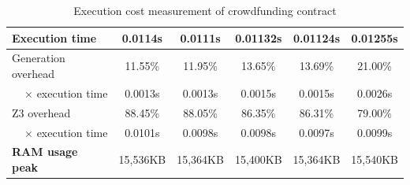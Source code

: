 \documentclass[english,runningheads]{llncs}
\begin{document}
\begin{table}[]
{\begin{tabular}{l||lllll}
\textbf{Execution time}                & \multicolumn{1}{c|}{0.0114s}  & \multicolumn{1}{c|}{0.0111s}  & \multicolumn{1}{c|}{0.01132s} & \multicolumn{1}{c|}{0.01124s} & \multicolumn{1}{c}{0.01255s} \\ \hline
Generation overhead                    & \multicolumn{1}{c|}{11.55\%}  & \multicolumn{1}{c|}{11.95\%}  & \multicolumn{1}{c|}{13.65\%}  & \multicolumn{1}{c|}{13.69\%}  & \multicolumn{1}{c}{21.00\%} \\ \hline
\multicolumn{1}{r||}{× execution time} & \multicolumn{1}{c|}{0.0013s}  & \multicolumn{1}{c|}{0.0013s}  & \multicolumn{1}{c|}{0.0015s}  & \multicolumn{1}{c|}{0.0015s}  & \multicolumn{1}{c}{0.0026s} \\ \hline
Z3 overhead                            & \multicolumn{1}{c|}{88.45\%}  & \multicolumn{1}{c|}{88.05\%}  & \multicolumn{1}{c|}{86.35\%}  & \multicolumn{1}{c|}{86.31\%}  & \multicolumn{1}{c}{79.00\%} \\ \hline
\multicolumn{1}{r||}{× execution time} & \multicolumn{1}{c|}{0.0101s}  & \multicolumn{1}{c|}{0.0098s}  & \multicolumn{1}{c|}{0.0098s}  & \multicolumn{1}{c|}{0.0097s}  & \multicolumn{1}{c}{0.0099s} \\ \hline
\textbf{RAM usage peak}                & \multicolumn{1}{c|}{15,536KB} & \multicolumn{1}{c|}{15,364KB} & \multicolumn{1}{c|}{15,400KB} & \multicolumn{1}{c|}{15,364KB} & \multicolumn{1}{c}{15,540KB}
\end{tabular}
}
\caption{Execution cost measurement of crowdfunding contract\label{table3}}
\end{table}
\end{document}
